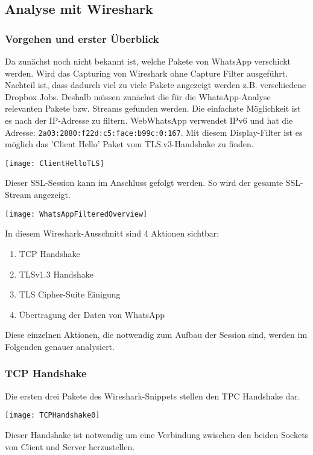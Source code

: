\subsection{Analyse mit Wireshark}
\subsubsection{Vorgehen und erster Überblick}
Da zunächst noch nicht bekannt ist, welche Pakete von WhatsApp verschickt werden.
Wird das Capturing von Wireshark ohne Capture Filter ausgeführt. Nachteil ist, 
dass dadurch viel zu viele Pakete angezeigt werden z.B. verschiedene Dropbox Jobs. 
Deshalb müssen zunächst die für die WhatsApp-Analyse relevanten Pakete bzw. Streams
gefunden werden. 
Die einfachste Möglichkeit ist es nach der IP-Adresse zu filtern. 
WebWhatsApp verwendet IPv6 und hat die Adresse: \texttt{2a03:2880:f22d:c5:face:b99c:0:167}. 
Mit diesem Display-Filter ist es möglich das 'Client Hello' Paket vom TLS.v3-Handshake zu finden. 

\begin{center}
    \texttt{[image: ClientHelloTLS]}
\end{center}
Dieser SSL-Session kann im Anschluss gefolgt werden. So wird der gesamte SSL-Stream angezeigt.

\begin{center}
    \texttt{[image: WhatsAppFilteredOverview]}
\end{center}

In diesem Wireshark-Ausschnitt sind 4 Aktionen sichtbar:
\begin{enumerate}
    \item TCP Handshake
    \item TLSv1.3 Handshake
    \item TLS Cipher-Suite Einigung
    \item Übertragung der Daten von WhatsApp    
\end{enumerate}

Diese einzelnen Aktionen, die notwendig zum Aufbau der Session sind, 
werden im Folgenden genauer analysiert.

\subsubsection{TCP Handshake}
Die ersten drei Pakete des Wireshark-Snippets stellen den TPC Handshake dar.

\begin{center}
    \texttt{[image: TCPHandshake0]}
\end{center}
Dieser Handshake ist notwendig um eine Verbindung zwischen den beiden Sockets von Client
und Server herzustellen.

